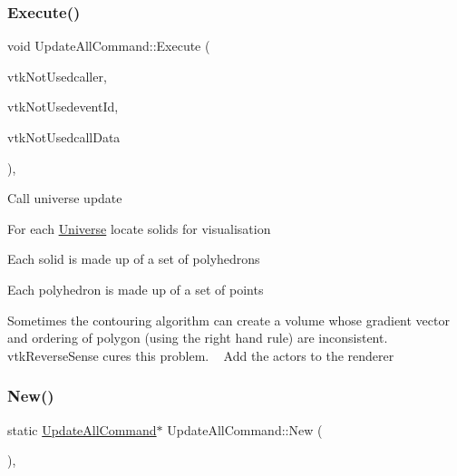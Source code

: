 \subsubsection{\texorpdfstring{Execute()}{Execute()}}
{\footnotesize\ttfamily void Update\+All\+Command\+::\+Execute (\begin{DoxyParamCaption}\item[{vtk\+Object $\ast$}]{vtk\+Not\+Usedcaller,  }\item[{unsigned long }]{vtk\+Not\+Usedevent\+Id,  }\item[{void $\ast$}]{vtk\+Not\+Usedcall\+Data }\end{DoxyParamCaption})\hspace{0.3cm}{\ttfamily [inline]}, {\ttfamily [override]}}

Call universe update

For each \mbox{\hyperlink{classUniverse}{Universe}} locate solids for visualisation

Each solid is made up of a set of polyhedrons

Each polyhedron is made up of a set of points

Sometimes the contouring algorithm can create a volume whose gradient vector and ordering of polygon (using the right hand rule) are inconsistent. vtk\+Reverse\+Sense cures this problem. ~\newline
 Add the actors to the renderer \mbox{\label{classUpdateAllCommand_a97cd6ef1c68bb473aef27c898b175517}} 
\subsubsection{\texorpdfstring{New()}{New()}}
{\footnotesize\ttfamily static \mbox{\hyperlink{classUpdateAllCommand}{Update\+All\+Command}}$\ast$ Update\+All\+Command\+::\+New (\begin{DoxyParamCaption}{ }\end{DoxyParamCaption})\hspace{0.3cm}{\ttfamily [inline]}, {\ttfamily [static]}}

\mbox{\label{classUpdateAllCommand_a228565b2a2306d425dc7eb3cda4d39a4}} 
